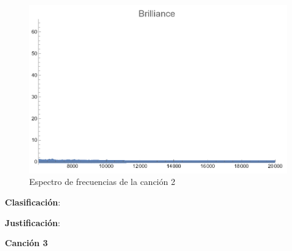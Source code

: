 \documentclass[12pt, letterpaper]{article}
\begin{document}
\begin{figure}[H]
\begin{minipage}{.3\textwidth}
  \end{minipage}
  \begin{minipage}{0.03\textwidth}\end{minipage}
  \begin{minipage}{.3\textwidth}
    \centering
    \includegraphics[width=.9\linewidth]{imgs/Cancion2/brilliance.png}
  \end{minipage}
  \caption{Espectro de frecuencias de la canción 2}
  \label{fig:esp02}
\end{figure}

\textbf{Clasificación}: 

\textbf{Justificación}: 

\newpage

\textbf{\large{Canción 3}}
\end{document}
